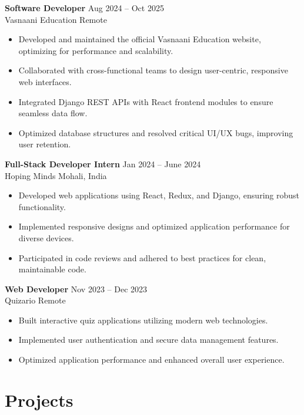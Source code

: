 \documentclass[a4paper,10pt]{article}
\begin{document}
\textbf{Software Developer} \hfill Aug 2024 -- Oct 2025 \\
Vasnaani Education \hfill Remote
\begin{itemize}[leftmargin=0.15in, label={-}]
    \item Developed and maintained the official Vasnaani Education website, optimizing for performance and scalability.
    \item Collaborated with cross-functional teams to design user-centric, responsive web interfaces.
    \item Integrated Django REST APIs with React frontend modules to ensure seamless data flow.
    \item Optimized database structures and resolved critical UI/UX bugs, improving user retention.
\end{itemize}

\textbf{Full-Stack Developer Intern} \hfill Jan 2024 -- June 2024 \\
Hoping Minds \hfill Mohali, India
\begin{itemize}[leftmargin=0.15in, label={-}]
    \item Developed web applications using React, Redux, and Django, ensuring robust functionality.
    \item Implemented responsive designs and optimized application performance for diverse devices.
    \item Participated in code reviews and adhered to best practices for clean, maintainable code.
\end{itemize}

\textbf{Web Developer} \hfill Nov 2023 -- Dec 2023 \\
Quizario \hfill Remote
\begin{itemize}[leftmargin=0.15in, label={-}]
    \item Built interactive quiz applications utilizing modern web technologies.
    \item Implemented user authentication and secure data management features.
    \item Optimized application performance and enhanced overall user experience.
\end{itemize}

\section{Projects}
\end{document}
